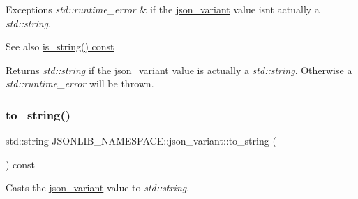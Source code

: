\begin{DoxyExceptions}{Exceptions}
{\em std\+::runtime\+\_\+error} & if the \hyperlink{classJSONLIB__NAMESPACE_1_1json__variant}{json\+\_\+variant} value isn\textquotesingle{}t actually a {\itshape std\+::string}. \\
\hline
\end{DoxyExceptions}
\begin{DoxySeeAlso}{See also}
\hyperlink{classJSONLIB__NAMESPACE_1_1json__variant_ae097a22fe419dd083ff07bfebf0e8151}{is\+\_\+string() const} 
\end{DoxySeeAlso}
\begin{DoxyReturn}{Returns}
{\itshape std\+::string} if the \hyperlink{classJSONLIB__NAMESPACE_1_1json__variant}{json\+\_\+variant} value is actually a {\itshape std\+::string}. Otherwise a {\itshape std\+::runtime\+\_\+error} will be thrown. 
\end{DoxyReturn}
\mbox{\label{classJSONLIB__NAMESPACE_1_1json__variant_a6bbb59173d134b69cded2d3da3a1b70f}} 
\subsubsection{\texorpdfstring{to\+\_\+string()}{to\_string()}\hspace{0.1cm}{\footnotesize\ttfamily [2/2]}}
{\footnotesize\ttfamily std\+::string J\+S\+O\+N\+L\+I\+B\+\_\+\+N\+A\+M\+E\+S\+P\+A\+C\+E\+::json\+\_\+variant\+::to\+\_\+string (\begin{DoxyParamCaption}{ }\end{DoxyParamCaption}) const}



Casts the \hyperlink{classJSONLIB__NAMESPACE_1_1json__variant}{json\+\_\+variant} value to {\itshape std\+::string}. 


